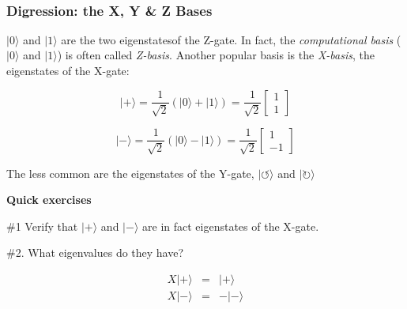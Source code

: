 \documentclass[11pt]{article}
\makeatletter
\newcommand{\boxspacing}{\kern\kvtcb@left@rule\kern\kvtcb@boxsep}
\newcommand{\prompt}[4]{
        {\ttfamily\llap{{\color{#2}[#3]:\hspace{3pt}#4}}\vspace{-\baselineskip}}
    }
\makeatother
\begin{document}
            
\prompt{Out}{outcolor}{51}{}
    
    \begin{center}
    \end{center}
    { \hspace*{\fill} \\}
    

    \begin{tcolorbox}[breakable, size=fbox, boxrule=1pt, pad at break*=1mm,colback=cellbackground, colframe=cellborder]
\prompt{In}{incolor}{ }{\boxspacing}
\begin{Verbatim}[commandchars=\\\{\}]

\end{Verbatim}
\end{tcolorbox}

    \hypertarget{digression-the-x-y-z-bases}{%
\subsubsection{Digression: the X, Y \& Z
Bases}\label{digression-the-x-y-z-bases}}

    \(|0\rangle\) and \(|1\rangle\) are the two eigenstatesof the Z-gate. In
fact, the \emph{computational basis} (\(|0\rangle\) and \(|1\rangle\))
is often called \emph{Z-basis}. Another popular basis is the
\emph{X-basis}, the eigenstates of the X-gate:

\[
|+\rangle 
= \frac{1}{\sqrt{2}}(|0\rangle + |1\rangle) 
= \frac{1}{\sqrt{2}}
\begin{bmatrix}
1\\
1
\end{bmatrix}
\]

\[
|-\rangle 
= \frac{1}{\sqrt{2}}(|0\rangle - |1\rangle) 
= \frac{1}{\sqrt{2}}
\begin{bmatrix}
1\\
-1
\end{bmatrix}
\]

    The less common are the eigenstates of the Y-gate,
\(|\circlearrowleft \rangle\) and \(| \circlearrowright \rangle\)

    \textbf{Quick exercises}

\#1 Verify that \(|+\rangle\) and \(|-\rangle\) are in fact eigenstates
of the X-gate.

\#2. What eigenvalues do they have?

\[
\begin{eqnarray}
X |+\rangle &=& |+\rangle \\
X |-\rangle &=& -|-\rangle
\end{eqnarray}
\]
\end{document}
